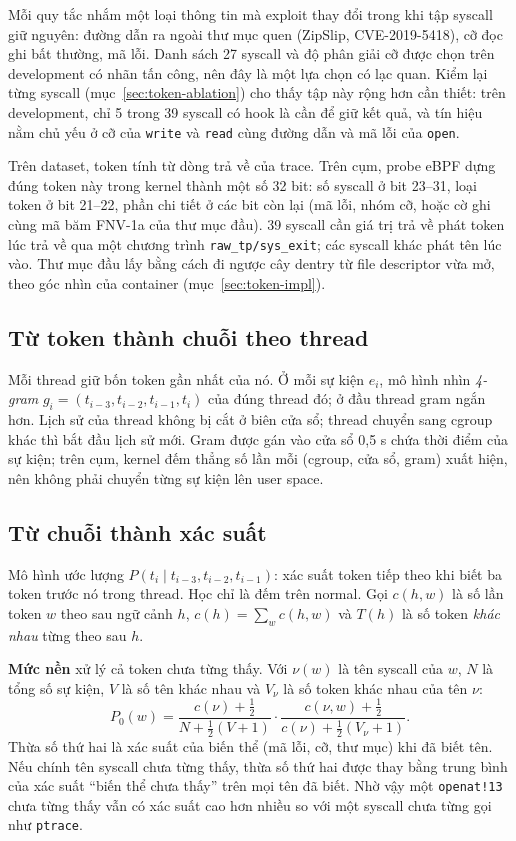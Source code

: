 Mỗi quy tắc nhắm một loại thông tin mà exploit thay đổi trong khi tập syscall giữ nguyên: đường dẫn ra ngoài thư mục quen (ZipSlip, CVE-2019-5418), cỡ đọc ghi bất thường, mã lỗi. Danh sách 27 syscall và độ phân giải cỡ được chọn trên development có nhãn tấn công, nên đây là một lựa chọn có lạc quan. Kiểm lại từng syscall (mục~\ref{sec:token-ablation}) cho thấy tập này rộng hơn cần thiết: trên development, chỉ 5 trong 39 syscall có hook là cần để giữ kết quả, và tín hiệu nằm chủ yếu ở cỡ của \texttt{write} và \texttt{read} cùng đường dẫn và mã lỗi của \texttt{open}.

Trên dataset, token tính từ dòng trả về của trace. Trên cụm, probe eBPF dựng đúng token này trong kernel thành một số 32 bit: số syscall ở bit 23--31, loại token ở bit 21--22, phần chi tiết ở các bit còn lại (mã lỗi, nhóm cỡ, hoặc cờ ghi cùng mã băm FNV-1a của thư mục đầu). 39 syscall cần giá trị trả về phát token lúc trả về qua một chương trình \texttt{raw\_\allowbreak{}tp/\allowbreak{}sys\_\allowbreak{}exit}; các syscall khác phát tên lúc vào. Thư mục đầu lấy bằng cách đi ngược cây dentry từ file descriptor vừa mở, theo góc nhìn của container (mục~\ref{sec:token-impl}).

\subsection{Từ token thành chuỗi theo thread}

Mỗi thread giữ bốn token gần nhất của nó. Ở mỗi sự kiện $e_i$, mô hình nhìn \emph{4-gram} $g_i = (t_{i-3}, t_{i-2}, t_{i-1}, t_i)$ của đúng thread đó; ở đầu thread gram ngắn hơn. Lịch sử của thread không bị cắt ở biên cửa sổ; thread chuyển sang cgroup khác thì bắt đầu lịch sử mới. Gram được gán vào cửa sổ 0,5 s chứa thời điểm của sự kiện; trên cụm, kernel đếm thẳng số lần mỗi (cgroup, cửa sổ, gram) xuất hiện, nên không phải chuyển từng sự kiện lên user space.

\subsection{Từ chuỗi thành xác suất}

Mô hình ước lượng $P(t_i \mid t_{i-3}, t_{i-2}, t_{i-1})$: xác suất token tiếp theo khi biết ba token trước nó trong thread. Học chỉ là đếm trên normal. Gọi $c(h, w)$ là số lần token $w$ theo sau ngữ cảnh $h$, $c(h) = \sum_w c(h, w)$ và $T(h)$ là số token \emph{khác nhau} từng theo sau $h$.

\textbf{Mức nền} xử lý cả token chưa từng thấy. Với $\nu(w)$ là tên syscall của $w$, $N$ là tổng số sự kiện, $V$ là số tên khác nhau và $V_\nu$ là số token khác nhau của tên $\nu$:
\[
P_0(w) = \frac{c(\nu) + \tfrac12}{N + \tfrac12 (V + 1)} \cdot \frac{c(\nu, w) + \tfrac12}{c(\nu) + \tfrac12 (V_\nu + 1)}.
\]
Thừa số thứ hai là xác suất của biến thể (mã lỗi, cỡ, thư mục) khi đã biết tên. Nếu chính tên syscall chưa từng thấy, thừa số thứ hai được thay bằng trung bình của xác suất ``biến thể chưa thấy'' trên mọi tên đã biết. Nhờ vậy một \texttt{openat!13} chưa từng thấy vẫn có xác suất cao hơn nhiều so với một syscall chưa từng gọi như \texttt{ptrace}.

